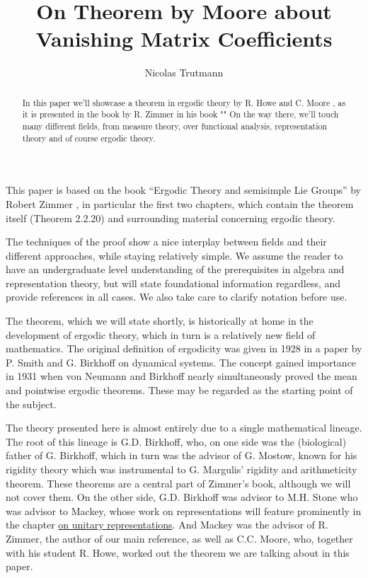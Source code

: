 \documentclass[
  12pt
]{article}
\title{On Theorem by Moore about Vanishing Matrix Coefficients}
\author{Nicolas Trutmann}
\date{}
\theoremstyle{break}
\theoremstyle{plain}
\begin{document}
\maketitle

\begin{abstract}
  In this paper we'll showcase a theorem in ergodic theory by R. Howe and
  C. Moore \cite{howe79}, as it is presented in the book by R. Zimmer in his
  book "" \cite{Zimmer84}
  On the way there, we'll touch many different
  fields, from measure theory, over functional analysis, representation
  theory and of course ergodic theory.
\end{abstract}

\newpage
\tableofcontents
\newpage


  This paper is based on the book ``Ergodic Theory and semisimple Lie
  Groups'' by Robert Zimmer \cite{Zimmer84}, in particular the first two
  chapters, which contain the theorem itself (Theorem 2.2.20) and
  surrounding material concerning ergodic theory.

  The techniques of the proof show a nice interplay between fields and
  their different approaches, while staying relatively simple. We assume
  the reader to have an undergraduate level understanding of the
  prerequisites in algebra and representation theory, but will state
  foundational information regardless, and provide references in all
  cases. We also take care to clarify notation before use.

  The theorem, which we will state shortly, is historically at home in the
  development of ergodic theory, which in turn is a relatively new field
  of mathematics. The original definition of ergodicity was given in 1928
  in a paper by P. Smith and G. Birkhoff on dynamical systems. The concept
  gained importance in 1931 when von Neumann and Birkhoff nearly
  simultaneously proved the mean and pointwise ergodic theorems. These may
  be regarded as the starting point of the subject.

  The theory presented here is almost entirely due to a single mathematical
  lineage. The root of this lineage is G.D. Birkhoff, who, on one side was the
  (biological) father of G. Birkhoff, which in turn was the advisor of G. Mostow,
  known for his rigidity theory which was instrumental to G. Margulis' rigidity
  and arithmeticity theorem. These theorems are a central part of Zimmer's book,
  although we will not cover them. On the other side, G.D. Birkhoff was advisor
  to M.H. Stone who was advisor to Mackey, whose work on representations will
  feature prominently in the chapter \hyperlink{the-direct-integral-and-unitary-representations}{on unitary representations}.
  And Mackey was the advisor of R. Zimmer, the author of our main reference, as
  well as C.C. Moore, who, together with his student R. Howe, worked out the
  theorem we are talking about in this paper.
\end{document}
